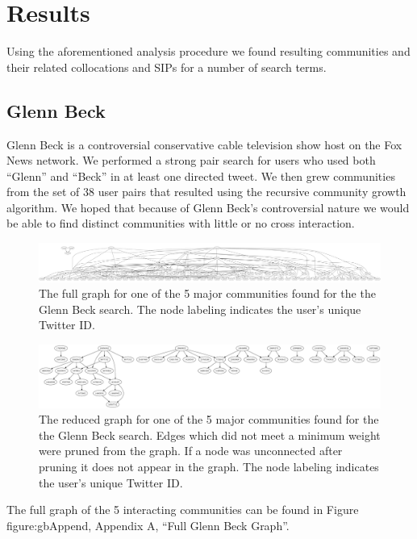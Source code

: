 \section{Results}
Using the aforementioned analysis procedure we found resulting communities and their related collocations and SIPs for a number of search terms.

\subsection{Glenn Beck}
Glenn Beck is a controversial conservative cable television show host on the Fox News network.  We performed a strong pair search for users who used both ``Glenn'' and ``Beck'' in at least one directed tweet.  We then grew communities from the set of 38 user pairs that resulted using the recursive community growth algorithm.  We hoped that because of Glenn Beck's controversial nature we would be able to find distinct communities with little or no cross interaction.

\begin{figure}
  \begin{center}
  \includegraphics[width=6in]{figures/gb5.pdf}
  \end{center}
  \caption{The full graph for one of the 5 major communities found for the the Glenn Beck search.  The node labeling indicates the user's unique Twitter ID.}
  \label{figure:gb-full}
\end{figure}

\begin{figure}
  \begin{center}
  \includegraphics[width=6in]{figures/gb5-reduced.pdf}
  \end{center}
  \caption{The reduced graph for one of the 5 major communities found for the the Glenn Beck search.  Edges which did not meet a minimum weight were pruned from the graph.  If a node was unconnected after pruning it does not appear in the graph.  The node labeling indicates the user's unique Twitter ID.}
  \label{figure:gb-reduced}
\end{figure}

The full graph of the 5 interacting communities can be found in Figure figure:gbAppend, Appendix A, ``Full Glenn Beck Graph''.